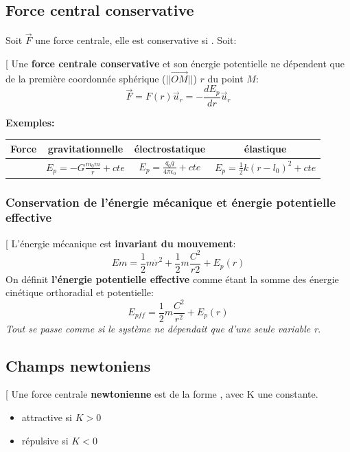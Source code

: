 \documentclass[12pt,hidelinks]{article}
\begin{document}
     \subsection{Force central conservative}
        Soit $\vec F$ une force centrale, elle est conservative si . Soit:
        \begin{DashedDefinition}{}[
            Une \textbf{force centrale conservative} et son énergie potentielle ne dépendent que de la première coordonnée sphérique ($|| \overrightarrow{OM} ||$) $r$ du point $M$:
            \[\vec F = F(r) \vec u_r = - \frac{dE_p}{dr} \vec u_r\]
        \end{DashedDefinition}
        \textbf{Exemples:}
        \begin{table}[h!]
            \centering
            \begin{tabular}{c|c|c|c}
            Force & gravitationnelle & électrostatique & élastique \\\hline
            & $E_p= -G \frac{m_0 m}{r}+cte$ & $E_p= \frac{q_0 q}{4 \pi \epsilon_0} + cte$ & $E_p= \frac{1}{2} k(r-l_0)^2 +cte$
            \end{tabular}
        \end{table}

        \subsubsection{Conservation de l'énergie mécanique et énergie potentielle effective}
            \begin{DashedDefinition}{}[
                L'énergie mécanique est \textbf{invariant du mouvement}:
                \[Em=\frac{1}{2}m \dot{r}^2 + \frac{1}{2} m \frac{C^2}{r2} + E_p(r)\]
                On définit \textbf{l'énergie potentielle effective} comme étant la somme des énergie cinétique orthoradial et potentielle:
                \[E_{pff}=\frac{1}{2} m \frac{C^2}{r^2} + E_p(r)\]
                \textit{Tout se passe comme si le système ne dépendait que d'une seule variable r}.
            \end{DashedDefinition}

    \subsection{Champs newtoniens}
        \begin{DashedDefinition}{}[
            Une force centrale \textbf{newtonienne} est de la forme , avec K une constante.
            \begin{itemize}
                \item attractive si $K>0$
                \item répulsive si $K<0$
            \end{itemize}
        \end{DashedDefinition}
\end{document}

